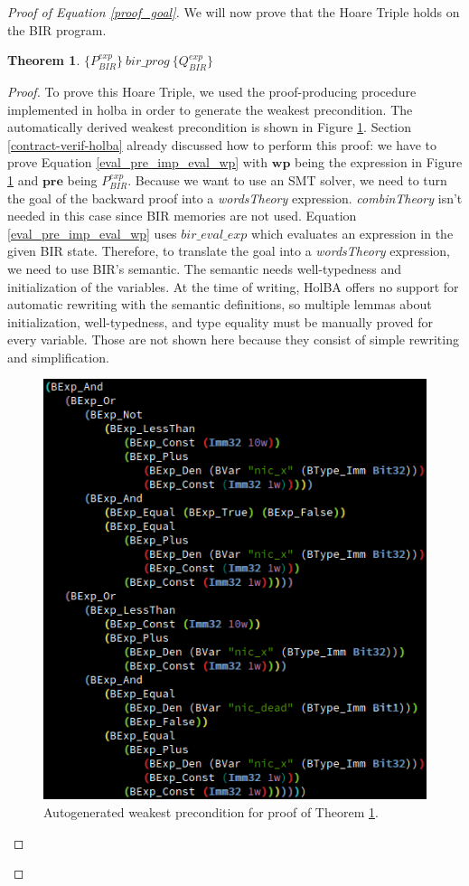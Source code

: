 \documentclass{kththesis}
\newcommand{\htriple}[3]{\ensuremath{\{#1\}~#2~\{#3\}}}
\newtheorem{theorem}{Theorem}[section]
\begin{document}
{\begin{proof}[Proof of Equation \ref{proof_goal}]
We will now prove that the Hoare Triple holds on the BIR program.
\bigskip

\begin{theorem} \label{proof_ht_thm}
\htriple{P^{exp}_{BIR}}{bir\_prog}{Q^{exp}_{BIR}}
\end{theorem}

\begin{proof}
To prove this Hoare Triple, we used the proof-producing procedure implemented in \gls{holba} in order to generate the weakest precondition. The automatically derived weakest precondition is shown in Figure \ref{proof_wp_exp}. Section \ref{contract-verif-holba} already discussed how to perform this proof: we have to prove Equation \ref{eval_pre_imp_eval_wp} with $\mathbf{wp}$ being the expression in Figure \ref{proof_wp_exp} and $\mathbf{pre}$ being $P^{exp}_{BIR}$. Because we want to use an \gls{SMT} solver, we need to turn the goal of the backward proof into a \textit{wordsTheory} expression. \textit{combinTheory} isn't needed in this case since BIR memories are not used. Equation \ref{eval_pre_imp_eval_wp} uses $bir\_eval\_exp$ which evaluates an expression in the given BIR state. Therefore, to translate the goal into a \textit{wordsTheory} expression, we need to use BIR's semantic. The semantic needs well-typedness and initialization of the variables. At the time of writing, HolBA offers no support for automatic rewriting with the semantic definitions, so multiple lemmas about initialization, well-typedness, and type equality must be manually proved for every variable. Those are not shown here because they consist of simple rewriting and simplification.

\begin{figure}[!h]
	\includegraphics[scale=.65]{figures/proof_wp_exp.png}
	\centering
	\caption{Autogenerated weakest precondition for proof of Theorem \ref{proof_ht_thm}.}
	\label{proof_wp_exp}
\end{figure}


\end{proof}
\end{proof}}
\end{document}
